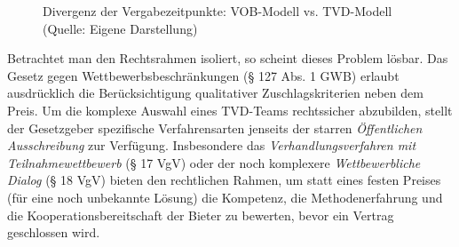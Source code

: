 \begin{figure}[ht]
{\begin{minipage}{\dimexpr\textwidth-2\fboxsep-2\fboxrule\relax}
        \end{minipage}%
    }
    \caption{Divergenz der Vergabezeitpunkte: \acs{VOB}-Modell vs. \acs{TVD}-Modell (Quelle: Eigene Darstellung)}
    \label{fig:beschaffungsparadoxon}
\end{figure}

Betrachtet man den Rechtsrahmen isoliert, so scheint dieses Problem lösbar. Das Gesetz gegen Wettbewerbsbeschränkungen (§ 127 Abs. 1 GWB) erlaubt ausdrücklich die Berücksichtigung qualitativer Zuschlagskriterien neben dem Preis. Um die komplexe Auswahl eines \acs{TVD}-Teams rechtssicher abzubilden, stellt der Gesetzgeber spezifische Verfahrensarten jenseits der starren \textit{Öffentlichen Ausschreibung} zur Verfügung.\autocite[Vgl.][§~127 Abs.~1]{noauthor_gesetz_2013}
Insbesondere das \textit{Verhandlungsverfahren mit Teilnahmewettbewerb} (§ 17 VgV) oder der noch komplexere \textit{Wettbewerbliche Dialog} (§ 18 VgV) bieten den rechtlichen Rahmen, um statt eines festen Preises (für eine noch unbekannte Lösung) die Kompetenz, die Methodenerfahrung und die Kooperationsbereitschaft der Bieter zu bewerten, bevor ein Vertrag geschlossen wird.\autocite[Vgl.][§~17]{vgv_verordnung_2016}

